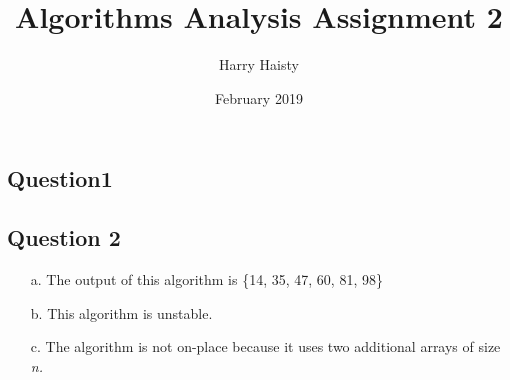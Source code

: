 \documentclass{article}
\title{Algorithms Analysis Assignment 2}
\author{Harry Haisty}
\date{February 2019}
\begin{document}
\maketitle

\subsection*{Question1}


\begin{algorithm}
\begin{algorithmic}[1]
\State $dmin \gets infinity$
\do{
\For {$\: j \gets 0 \: to i+1 \: to \:  n-1$ \:} 
\do{
\State $temp \gets |A[i] - A[j]|$
\If {$ \: temp < \: dmin$}
\then{
\State $dmin \gets temp$}

\State \textbf{return} $\: dmin$
\end{algorithmic}
\end{algorithm}

\subsection*{Question 2}
\begin{enumerate}
    \item[a.] The output of this algorithm is \{14, 35, 47, 60, 81, 98\}
    \item[b.] This algorithm is unstable. 
    \item[c.] The algorithm is not on-place because it uses two additional arrays of size \textit{n.}
\end{enumerate}
\end{document}
